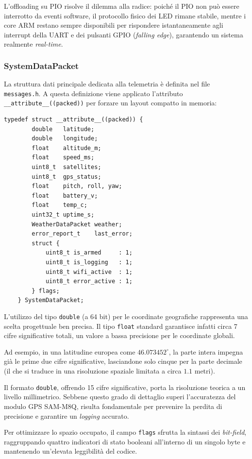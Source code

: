 L'offloading su PIO risolve il dilemma alla radice: poiché il PIO non può essere interrotto da eventi software, il protocollo fisico dei LED rimane stabile, mentre i core ARM restano sempre disponibili per rispondere istantaneamente agli interrupt della UART e dei pulsanti GPIO (\textit{falling edge}), garantendo un sistema realmente \textit{real-time}.



\subsubsection*{SystemDataPacket}
La struttura dati principale dedicata alla telemetria è definita nel file \texttt{messages.h}. A questa definizione viene applicato l'attributo \texttt{\_\_attribute\_\_((packed))} per forzare un layout compatto in memoria:

\begin{lstlisting}[caption={messages.h --- Struttura telemetrica senza padding}]
	typedef struct __attribute__((packed)) {
		double   latitude;
		double   longitude;
		float    altitude_m;
		float    speed_ms;
		uint8_t  satellites;
		uint8_t  gps_status;         
		float    pitch, roll, yaw;   
		float    battery_v;
		float    temp_c;
		uint32_t uptime_s;
		WeatherDataPacket weather; 
		error_report_t    last_error;
		struct {
			uint8_t is_armed     : 1;
			uint8_t is_logging   : 1;
			uint8_t wifi_active  : 1;
			uint8_t error_active : 1;
		} flags;
	} SystemDataPacket;
\end{lstlisting}

L'utilizzo del tipo \texttt{double} (a 64 bit) per le coordinate geografiche rappresenta una scelta progettuale ben precisa. Il tipo \texttt{float} standard garantisce infatti circa 7 cifre significative totali, un valore a bassa precisione per le coordinate globali. 

Ad esempio, in una latitudine europea come $46.073452^\circ$, la parte intera impegna già le prime due cifre significative, lasciandone solo cinque per la parte decimale (il che si traduce in una risoluzione spaziale limitata a circa $1.1$ metri). 

Il formato \texttt{double}, offrendo 15 cifre significative, porta la risoluzione teorica a un livello millimetrico. Sebbene questo grado di dettaglio superi l'accuratezza del modulo GPS SAM-M8Q, risulta fondamentale per prevenire la perdita di precisione e garantire un \emph{logging} accurato.

Per ottimizzare lo spazio occupato, il campo \texttt{flags} sfrutta la sintassi dei \emph{bit-field}, raggruppando quattro indicatori di stato booleani all'interno di un singolo byte e mantenendo un'elevata leggibilità del codice. 

